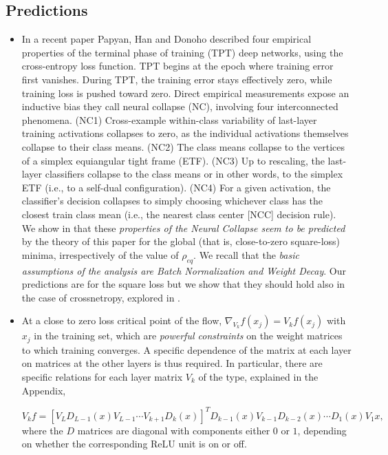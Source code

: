 \documentclass[11pt]{article}
\begin{document}
\subsection{Predictions}
 \begin{itemize}

 \item In a recent paper Papyan, Han and Donoho\cite{Papyan24652}
   described four empirical properties of the terminal phase of
   training (TPT) deep networks, using the cross-entropy loss
   function. TPT begins at the epoch where training error first
   vanishes. During TPT, the training error stays effectively zero,
   while training loss is pushed toward zero. Direct empirical
   measurements expose an inductive bias they call neural collapse
   (NC), involving four interconnected phenomena. (NC1) Cross-example
   within-class variability of last-layer training activations
   collapses to zero, as the individual activations themselves
   collapse to their class means. (NC2) The class means collapse to
   the vertices of a simplex equiangular tight frame (ETF). (NC3) Up
   to rescaling, the last-layer classifiers collapse to the class
   means or in other words, to the simplex ETF (i.e., to a self-dual
   configuration). (NC4) For a given activation, the
   classifier{\textquoteright}s decision collapses to simply choosing
   whichever class has the closest train class mean (i.e., the nearest
   class center [NCC] decision rule).  We show in \cite{PoggioLiaoArxiv2020} that these {\it properties of the Neural
     Collapse\cite{Papyan24652} seem to be predicted} by the theory of
   this paper for the global (that is, close-to-zero square-loss)
   minima, irrespectively of the value of $\rho_{eq}$. We recall that
   the {\it basic assumptions of the analysis are Batch Normalization and
   Weight Decay}. Our predictions are for the square loss but we show
 that they should hold also in the case of
 crossnetropy, explored in \cite{Papyan24652}.

 \item At a close to zero loss critical point of  the flow, 
$\nabla_{V_k} f(x_j) = V_k f(x_j)$ with $x_j$ in
   the training set, which are  {\it powerful constraints} on the weight
   matrices to which training converges.  A specific
   dependence of the matrix at each layer on matrices at the other
   layers is thus required. In particular, there are specific relations for each layer matrix
   $V_k$ of the type, explained in the Appendix,

\begin{equation}
  V_k f=[V_L D_{L-1}(x)
  V_{L-1}  \cdots V_{k+1} D_k(x)]^T D_{k-1}(x)
  V_{k-1}D_{k-2}(x)  \cdots D_1(x)  V_1 x,
\end{equation}
\noindent where the $D$ matrices are diagonal with components either
$0$ or $1$, depending on whether the corresponding ReLU unit is on or off. 


\end{itemize}
\end{document}
